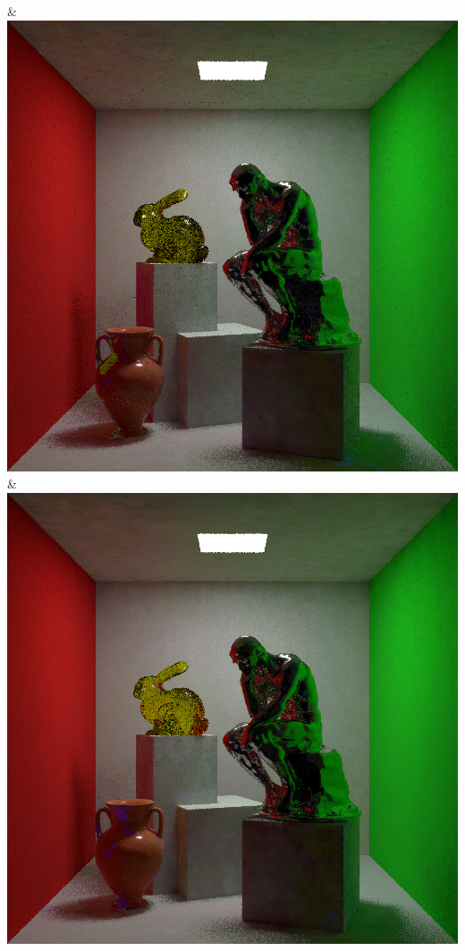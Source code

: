& \includegraphics[width=\linewidth]{figures/py/tests/path_termination/bthk9+nee_1spp_thinker.png}
& \includegraphics[width=\linewidth]{figures/py/tests/path_termination/1stdiff+nee_1spp_thinker.png}
